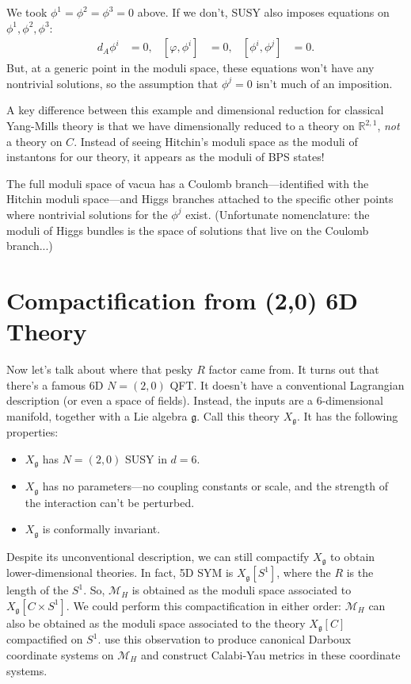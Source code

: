 \begin{rem*}
We took $\phi^{1}=\phi^{2}=\phi^{3}=0$ above. If we don't, SUSY also
imposes equations on $\phi^{1},\phi^{2},\phi^{3}$:
\begin{align*}
d_{A}\phi^{i} & =0, & \left[\varphi,\phi^{i}\right] & =0, & \left[\phi^{i},\phi^{j}\right] & =0.
\end{align*}
But, at a generic point in the moduli space, these equations won't
have any nontrivial solutions, so the assumption that $\phi^{j}=0$
isn't much of an imposition.
\end{rem*}

A key difference between this example and dimensional reduction for classical
Yang-Mills theory is that we have dimensionally reduced to a theory on $\mathbb{R}^{2,1}$,
\emph{not} a theory on $C$. Instead of seeing Hitchin's moduli space as the moduli of
instantons for our theory, it appears as the moduli of BPS states!

The full moduli space of vacua has a Coulomb branch---identified with
the Hitchin moduli space---and Higgs branches attached to the specific
other points where nontrivial solutions for the $\phi^{j}$ exist.
(Unfortunate nomenclature: the moduli of Higgs bundles is the space
of solutions that live on the Coulomb branch...)


\section{Compactification from (2,0) 6D Theory}

Now let's talk about where that pesky $R$ factor came from. It turns
out that there's a famous 6D $N=\left(2,0\right)$ QFT. It doesn't
have a conventional Lagrangian description (or even a space of fields).
Instead, the inputs are a 6-dimensional manifold, together with a
Lie algebra $\mathfrak{g}$. Call this theory $X_{\mathfrak{g}}$.
It has the following properties:
\begin{itemize}
\item $X_{\mathfrak{g}}$ has $N=\left(2,0\right)$ SUSY in $d=6$.
\item $X_{\mathfrak{g}}$ has no parameters---no coupling constants or scale,
and the strength of the interaction can't be perturbed.
\item $X_{\mathfrak{g}}$ is conformally invariant.
\end{itemize}
Despite its unconventional description, we can still compactify $X_{\mathfrak{g}}$
to obtain lower-dimensional theories. In fact, 5D SYM is $X_{\mathfrak{g}}\left[S^{1}\right]$,
where the $R$ is the length of the $S^{1}$. So, $\mathcal{M}_{H}$
is obtained as the moduli space associated to $X_{\mathfrak{g}}\left[C\times S^{1}\right]$.
We could perform this compactification in either order: $\mathcal{M}_{H}$
can also be obtained as the moduli space associated to the theory
$X_{\mathfrak{g}}\left[C\right]$ compactified on $S^{1}$. \cite{GMN}
use this observation to produce canonical Darboux coordinate systems
on $\mathcal{M}_{H}$ and construct Calabi-Yau metrics in these coordinate
systems.

